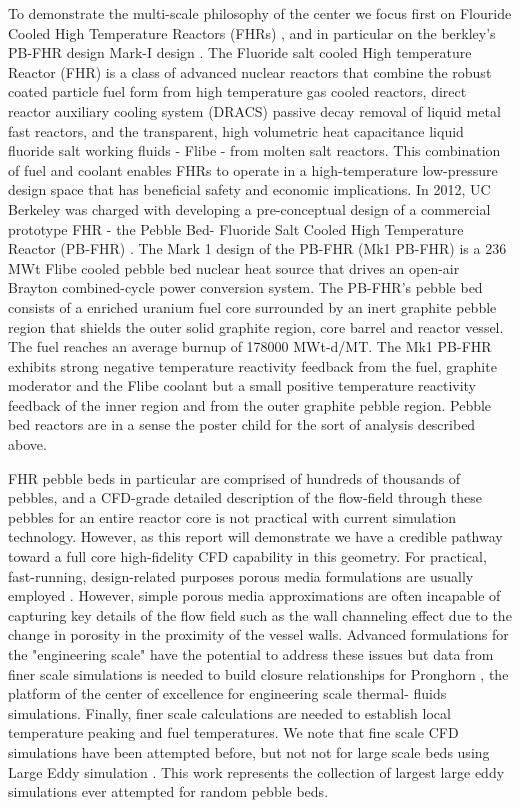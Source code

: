 To demonstrate the multi-scale philosophy of the center we focus first on Flouride Cooled High Temperature Reactors (FHRs) \cite{forsberg2015fluoride}, and in particular on the berkley's PB-FHR design Mark-I design \cite{cisneros2014technical}. The Fluoride salt cooled High temperature Reactor (FHR) is a class of advanced nuclear reactors that combine the robust coated particle fuel form from high temperature gas cooled reactors, direct reactor auxiliary cooling system (DRACS) passive decay removal of liquid metal fast reactors, and the transparent, high volumetric heat capacitance liquid fluoride salt working fluids - Flibe - from molten salt reactors. This combination of fuel and coolant enables FHRs to operate in a high-temperature low-pressure design space that has beneficial safety and economic implications. In 2012, UC Berkeley was charged with developing a pre-conceptual design of a commercial prototype FHR - the Pebble Bed- Fluoride Salt Cooled High Temperature Reactor (PB-FHR) \cite{cisneros2014technical}. The Mark 1 design of the PB-FHR (Mk1 PB-FHR) is a 236 MWt Flibe cooled pebble bed nuclear heat source that drives an open-air Brayton combined-cycle power conversion system. The PB-FHR's pebble bed consists of a enriched uranium fuel core surrounded by an inert graphite pebble region that shields the outer solid graphite region, core barrel and reactor vessel. The fuel reaches an average burnup of 178000 MWt-d/MT. The Mk1 PB-FHR exhibits strong negative temperature reactivity feedback from the fuel, graphite moderator and the Flibe coolant but a small positive temperature reactivity feedback of the inner region and from the outer graphite pebble region. Pebble bed reactors are in a sense the poster child for the sort of analysis described above.

FHR pebble beds in particular are comprised of hundreds of thousands of pebbles, and a CFD-grade detailed description of the flow-field through these pebbles for an entire reactor core is not practical with current simulation technology. However, as this report will demonstrate we have a credible pathway toward a full core high-fidelity CFD capability in this geometry. For practical, fast-running, design-related purposes porous media formulations are usually employed  \cite{zou2017validation}. However, simple porous media approximations are often incapable of capturing key details of the flow field such as the wall channeling effect due to the change in porosity in the proximity of the vessel walls.  Advanced formulations for the "engineering scale" have the potential to address these issues but data from finer scale simulations is needed to build closure relationships for Pronghorn \cite{novak2018pronghorn}, the platform of the center of excellence for engineering scale thermal- fluids simulations. Finally, finer scale calculations are needed to establish local temperature peaking and fuel temperatures. We note that fine scale CFD simulations have been attempted before, but not not for large scale beds using Large Eddy simulation \cite{vanstaden2018}. This work represents the collection of largest large eddy simulations ever attempted for random pebble beds.

